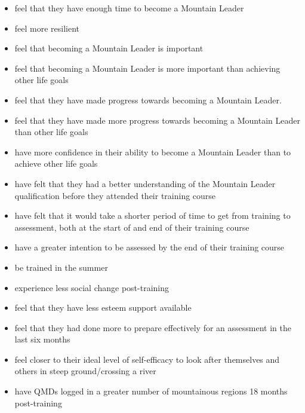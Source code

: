 \documentclass[
  12pt,
  a4paper,
]{book}
\providecommand{\tightlist}{%
  \setlength{\itemsep}{0pt}\setlength{\parskip}{0pt}}
\begin{document}
\begin{itemize}
\tightlist
\item
  feel that they have enough time to become a Mountain Leader
\item
  feel more resilient
\item
  feel that becoming a Mountain Leader is important
\item
  feel that becoming a Mountain Leader is more important than achieving other life goals
\item
  feel that they have made progress towards becoming a Mountain Leader.
\item
  feel that they have made more progress towards becoming a Mountain Leader than other life goals
\item
  have more confidence in their ability to become a Mountain Leader than to achieve other life goals
\item
  have felt that they had a better understanding of the Mountain Leader qualification before they attended their training course
\item
  have felt that it would take a shorter period of time to get from training to assessment, both at the start of and end of their training course
\item
  have a greater intention to be assessed by the end of their training course
\item
  be trained in the summer
\item
  experience less social change post-training
\item
  feel that they have less esteem support available
\item
  feel that they had done more to prepare effectively for an assessment in the last six months
\item
  feel closer to their ideal level of self-efficacy to look after themselves and others in steep ground/crossing a river
\item
  have QMDs logged in a greater number of mountainous regions 18 months post-training
\end{itemize}
\end{document}
